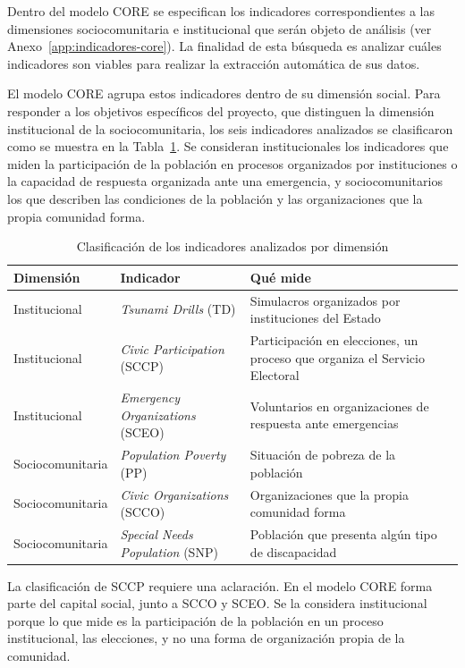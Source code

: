 \documentclass[12pt,letterpaper,oneside]{report}
\begin{document}
Dentro del modelo CORE se especifican los indicadores correspondientes a las dimensiones sociocomunitaria e institucional que ser\'an objeto de an\'alisis (ver Anexo~\ref{app:indicadores-core}). La finalidad de esta b\'usqueda es analizar cu\'ales indicadores son viables para realizar la extracci\'on autom\'atica de sus datos.

El modelo CORE agrupa estos indicadores dentro de su dimensi\'on social. Para responder a los objetivos espec\'ificos del proyecto, que distinguen la dimensi\'on institucional de la sociocomunitaria, los seis indicadores analizados se clasificaron como se muestra en la Tabla~\ref{tab:clasificacion-indicadores}. Se consideran institucionales los indicadores que miden la participaci\'on de la poblaci\'on en procesos organizados por instituciones o la capacidad de respuesta organizada ante una emergencia, y sociocomunitarios los que describen las condiciones de la poblaci\'on y las organizaciones que la propia comunidad forma.

\begin{table}[H]
\centering
\caption{Clasificaci\'on de los indicadores analizados por dimensi\'on}
\label{tab:clasificacion-indicadores}
\begin{tabular}{|p{2.8cm}|p{5.6cm}|p{5.2cm}|}
\hline
\textbf{Dimensi\'on} & \textbf{Indicador} & \textbf{Qu\'e mide} \\
\hline
Institucional & \textit{Tsunami Drills} (TD) & Simulacros organizados por instituciones del Estado \\
\hline
Institucional & \textit{Civic Participation} (SCCP) & Participaci\'on en elecciones, un proceso que organiza el Servicio Electoral \\
\hline
Institucional & \textit{Emergency Organizations} (SCEO) & Voluntarios en organizaciones de respuesta ante emergencias \\
\hline
Sociocomunitaria & \textit{Population Poverty} (PP) & Situaci\'on de pobreza de la poblaci\'on \\
\hline
Sociocomunitaria & \textit{Civic Organizations} (SCCO) & Organizaciones que la propia comunidad forma \\
\hline
Sociocomunitaria & \textit{Special Needs Population} (SNP) & Poblaci\'on que presenta alg\'un tipo de discapacidad \\
\hline
\end{tabular}
\end{table}

La clasificaci\'on de SCCP requiere una aclaraci\'on. En el modelo CORE forma parte del capital social, junto a SCCO y SCEO. Se la considera institucional porque lo que mide es la participaci\'on de la poblaci\'on en un proceso institucional, las elecciones, y no una forma de organizaci\'on propia de la comunidad.
\end{document}
